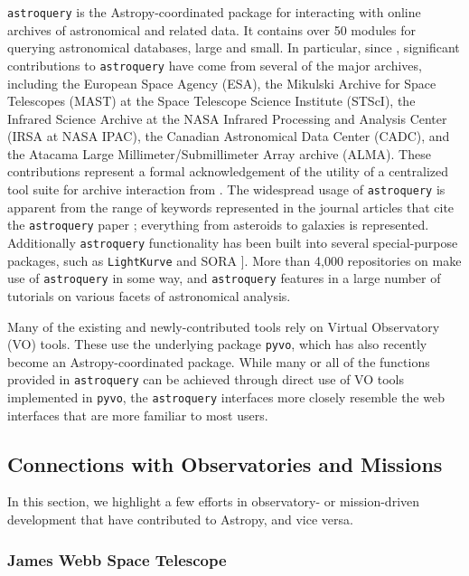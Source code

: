 \documentclass[modern]{aastex631}
\newcommand{\secauthor}[1]{{\color{blue}Author:~\textit{#1}}}
\begin{document}
\texttt{astroquery} \citep{Ginsburg2019} is the Astropy-coordinated package for
interacting with online archives of astronomical and related data. It contains
over 50 modules for querying astronomical databases, large and small. In
particular, since \paperii, significant contributions to \texttt{astroquery}
have come from several of the major archives, including the European Space
Agency (ESA), the Mikulski Archive for Space Telescopes (MAST) at the Space
Telescope Science Institute (STScI), the Infrared Science Archive at the NASA
Infrared Processing and Analysis Center (IRSA at NASA IPAC), the Canadian
Astronomical Data Center (CADC), and the Atacama Large Millimeter/Submillimeter
Array archive (ALMA). These contributions represent a formal acknowledgement of
the utility of a centralized tool suite for archive interaction from \python.
The widespread usage of \texttt{astroquery} is apparent from the range of
keywords represented in the journal articles that cite the \texttt{astroquery}
paper \citep{Ginsburg2019}; everything from asteroids to galaxies is
represented. Additionally \texttt{astroquery} functionality has been built into
several special-purpose \python packages, such as \texttt{LightKurve}
\citep{LightKurve} and SORA \citep{SORA}]. More than 4,000 repositories on
\github make use of \texttt{astroquery} in some way, and \texttt{astroquery}
features in a large number of tutorials on various facets of astronomical
analysis.

Many of the existing and newly-contributed tools rely on Virtual Observatory
(VO) tools. These use the underlying package \texttt{pyvo}, which has also
recently become an Astropy-coordinated package. While many or all of the
functions provided in \texttt{astroquery} can be achieved through direct use of
VO tools implemented in \texttt{pyvo}, the \texttt{astroquery} interfaces more
closely resemble the web interfaces that are more familiar to most users.

\subsection{Connections with Observatories and Missions}

In this section, we highlight a few efforts in observatory- or mission-driven
development that have contributed to Astropy, and vice versa.

\subsubsection{James Webb Space Telescope}
\end{document}
